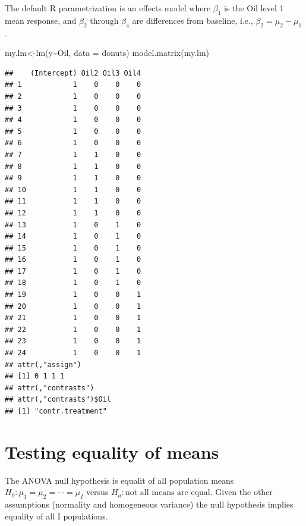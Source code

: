\documentclass[
]{book}
\newenvironment{Shaded}{\begin{snugshade}}{\end{snugshade}}
\newcommand{\AttributeTok}[1]{\textcolor[rgb]{0.77,0.63,0.00}{#1}}
\newcommand{\FunctionTok}[1]{\textcolor[rgb]{0.00,0.00,0.00}{#1}}
\newcommand{\NormalTok}[1]{#1}
\newcommand{\OtherTok}[1]{\textcolor[rgb]{0.56,0.35,0.01}{#1}}
\newcommand{\SpecialCharTok}[1]{\textcolor[rgb]{0.00,0.00,0.00}{#1}}
\begin{document}
The default R parametrization is an effects model where \(\beta_1\) is the Oil level 1 mean response, and \(\beta_2\) through \(\beta_4\) are differences from baseline, i.e., \(\beta_2 = \mu_{2} - \mu_1\).

\begin{Shaded}
\begin{Highlighting}[]
\NormalTok{my.lm}\OtherTok{\textless{}{-}}\FunctionTok{lm}\NormalTok{(y}\SpecialCharTok{\textasciitilde{}}\NormalTok{Oil, }\AttributeTok{data =}\NormalTok{ donuts)}
\FunctionTok{model.matrix}\NormalTok{(my.lm)}
\end{Highlighting}
\end{Shaded}

\begin{verbatim}
##    (Intercept) Oil2 Oil3 Oil4
## 1            1    0    0    0
## 2            1    0    0    0
## 3            1    0    0    0
## 4            1    0    0    0
## 5            1    0    0    0
## 6            1    0    0    0
## 7            1    1    0    0
## 8            1    1    0    0
## 9            1    1    0    0
## 10           1    1    0    0
## 11           1    1    0    0
## 12           1    1    0    0
## 13           1    0    1    0
## 14           1    0    1    0
## 15           1    0    1    0
## 16           1    0    1    0
## 17           1    0    1    0
## 18           1    0    1    0
## 19           1    0    0    1
## 20           1    0    0    1
## 21           1    0    0    1
## 22           1    0    0    1
## 23           1    0    0    1
## 24           1    0    0    1
## attr(,"assign")
## [1] 0 1 1 1
## attr(,"contrasts")
## attr(,"contrasts")$Oil
## [1] "contr.treatment"
\end{verbatim}

\hypertarget{testing-equality-of-means}{%
\section{Testing equality of means}\label{testing-equality-of-means}}

The ANOVA null hypothesis is equalit of all population means \(H_0:\mu_1 = \mu_2 = \cdots = \mu_I\) versus \(H_a:\text{not all means are equal}\). Given the other assumptions (normality and homogeneous variance) the null hypothesis implies equality of all I populations.
\end{document}
